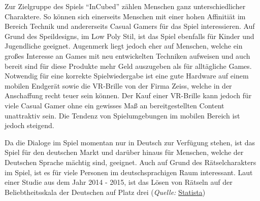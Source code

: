 
Zur Zielgruppe des Spiels “InCubed” zählen Menschen ganz unterschiedlicher Charaktere. So können sich einerseits Menschen mit einer hohen Affinitiät im Bereich Technik und andererseits Casual Gamers für das Spiel interessieren. Auf Grund des Speildesigns, im Low Poly Stil, ist das Spiel ebenfalls für Kinder und Jugendliche geeignet. Augenmerk liegt jedoch eher auf Menschen, welche ein großes Interesse an Games mit neu entwickelten Techniken aufweisen und auch bereit sind für diese Produkte mehr Geld auszugeben als für alltägliche Games. Notwendig für eine korrekte Spielwiedergabe ist eine gute Hardware auf einem mobilen Endgerät sowie die VR-Brille von der Firma Zeiss, welche in der Anschaffung recht teuer sein können. Der Kauf einer VR-Brille kann jedoch für viele Casual Gamer ohne ein gewisses Maß an bereitgestellten Content unattraktiv sein. Die Tendenz von Spielumgebungen im mobilen Bereich ist jedoch steigend.

Da die Dialoge im Spiel momentan nur in Deutsch zur Verfügung stehen, ist das Spiel für den deutschen Markt und darüber hinaus für Menschen, welche der Deutschen Sprache mächtig sind, geeignet. Auch auf Grund des Rätselcharakters im Spiel, ist es für viele Personen im deutschsprachigen Raum interessant. Laut einer Studie aus dem Jahr 2014 - 2015, ist das Lösen von Rätseln auf der Beliebtheitsskala der Deutschen auf Platz drei (\textit{Quelle:} \hyperlink{http://de.statista.com/statistik/daten/studie/171168/umfrage/haeufig-betriebene-freizeitaktivitaeten/}{Statista})
